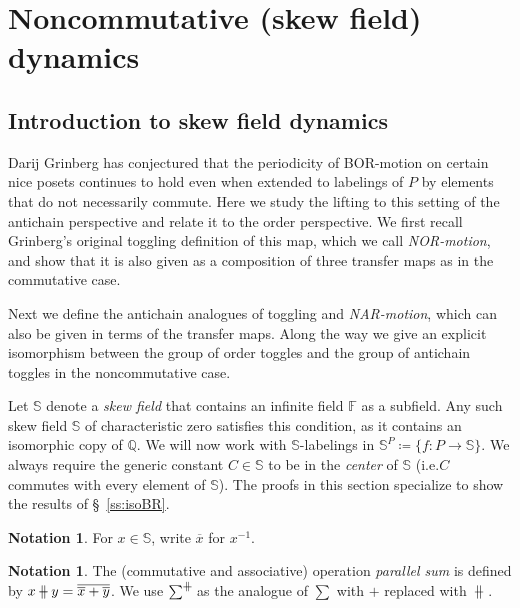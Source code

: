 \documentclass[10pt]{amsart}
\theoremstyle{definition}
\newtheorem{nota}[theo]{Notation}
\newcommand{\ie}{i.e.}
\newcommand{\defn}[1]{\emph{#1}}
\newcommand{\bigsig}{{\sum}}
\DeclareMathOperator*{\sumpar}{\bigsig^{\ \mathclap{\|}\mathclap{\rule[1.3pt]{6pt}{0.4pt}}}\:}
\def\parallelsum{\:\ \mathclap{\|}\mathclap{-}\ \:}
\newcommand{\qq}{\mathbb{Q}}
\newcommand{\ff}{\mathbb{F}}
\newcommand{\bbs}{\mathbb{S}}
\begin{document}
\section{Noncommutative (skew field) dynamics}\label{sec:noncommutative}

\subsection{Introduction to skew field dynamics}

Darij Grinberg has conjectured that the periodicity of BOR-motion on certain nice posets
continues to hold even when extended to labelings of $P$ by elements that do not
necessarily commute. Here we study the lifting to this setting of the
antichain perspective and relate it to the order perspective. We first recall Grinberg's original toggling definition of this map, which we call \defn{NOR-motion}, and show that it is also given as a composition of three transfer maps as in the commutative case. 

Next we define the antichain analogues of toggling and \defn{NAR-motion}, which can also be given in terms of the transfer maps. Along the way we give an explicit isomorphism between the group of order toggles and the group of antichain toggles in the noncommutative case. 


Let $\bbs$ denote a \defn{skew field} that contains an infinite field $\ff$ as a
subfield. Any such skew field $\bbs$ of characteristic zero satisfies this condition, as it contains an isomorphic copy of $\qq$.
We will now work with $\bbs$-labelings in $\bbs^P\coloneqq \{f:P\rightarrow \bbs \}$.
We always require the generic constant $C\in \bbs$ to be in the
\emph{center} of $\bbs$ (\ie $C$ commutes with every element of $\bbs$). The proofs in
this section specialize to show the results of \S~\ref{ss:isoBR}. 

\begin{nota}
For $x\in\bbs$, write $\overline{x}$ for $x^{-1}$.
\end{nota}

\begin{nota}
The (commutative and associative) operation \defn{parallel sum} is defined by $x\parallelsum y=\overline{\overline{x}+\overline{y}}$.
We use $\sumpar$ as the analogue of $\sum$ with $+$ replaced with $\parallelsum$.
\end{nota}
\end{document}
